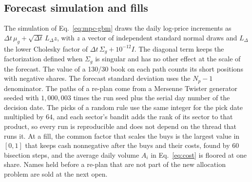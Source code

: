 \subsection{Forecast simulation and fills}

The simulation of Eq.~\eqref{eq:mpc-gbm} draws the daily log-price increments as $\Delta t\,\mu_g +
\sqrt{\Delta t}\,L_{\Delta} z$, with $z$ a vector of independent standard normal draws and $L_{\Delta}$ the lower
Cholesky factor of
$\Delta t\,\Sigma_g + 10^{-12} I$. The diagonal term keeps the factorization defined when $\Sigma_g$ is singular
and has no other effect at the scale of the forecast. The value of a 130/30 book on each path counts its short
positions with negative shares. The forecast standard deviation uses the $N_p - 1$ denominator.
The paths of a re-plan come from a Mersenne Twister generator seeded with $1{,}000{,}003$ times the run seed plus
the serial day number of the decision date. The picks of a random rule use the same integer for the pick date
multiplied by $64$, and each sector's bandit adds the rank of its sector to that product, so every run is
reproducible and does not depend on the thread that runs it. At a fill,
the common factor that scales the buys is the largest value in $[0, 1]$ that keeps cash nonnegative after the
buys and their costs, found by $60$ bisection steps, and the average daily volume $A_i$ in Eq.~\eqref{eq:cost} is
floored at one share. Names held before a re-plan that are not part of the new allocation problem are sold at the
next open.
